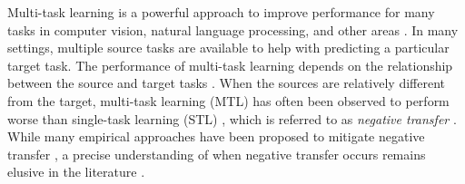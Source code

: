 \iffalse
Multi-task learning is a powerful approach to improve performance for many tasks in computer vision, natural language processing, and other areas \cite{C97,ZY17,R17}.
In many settings, multiple source tasks are available to help with predicting a particular target task.
The performance of multi-task learning depends on the relationship between the source and target tasks \cite{C97}.
When the sources are relatively different from the target, multi-task learning (MTL) has often been observed to perform worse than single-task learning (STL) \cite{AP16,BS17}, which is referred to as \textit{negative transfer} \cite{PY09}.
While many empirical approaches have been proposed to mitigate negative transfer \cite{ZY17}, a precise understanding of when negative transfer occurs remains elusive in the literature \cite{R17}.


